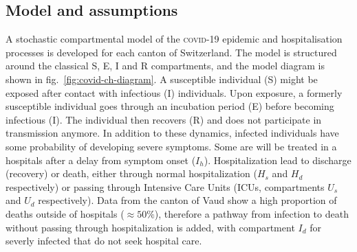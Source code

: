 \subsection{Model and assumptions}
A stochastic compartmental model of the \textsc{covid}-19 epidemic and hospitalisation processes is developed for each canton of Switzerland. The model is structured around the classical S, E, I and R compartments\cite{Kermack:ContributionMathematicalTheory:1927}, and the model diagram is shown in fig.~\ref{fig:covid-ch-diagram}. %
A susceptible individual (S) might be exposed after contact with infectious (I) individuals. Upon exposure, a formerly susceptible individual goes through an incubation period (E) before becoming infectious (I). The individual then recovers (R) and does not participate in transmission anymore. 
In addition to these dynamics, infected individuals have some probability of developing severe symptoms. Some are will be treated in a hospitals after a delay from symptom onset ($I_h$). Hospitalization lead to discharge (recovery) or death, either through normal hospitalization ($H_{s}$ and $H_d$ respectively) or passing through Intensive Care Units (ICUs, compartments $U_{s}$ and $U_d$ respectively). Data from the canton of Vaud show a high proportion of deaths outside of hospitals ($\approx 50\%$), therefore a pathway from infection to death without passing through hospitalization is added, with compartment $I_d$ for severly infected that do not seek hospital care. 

